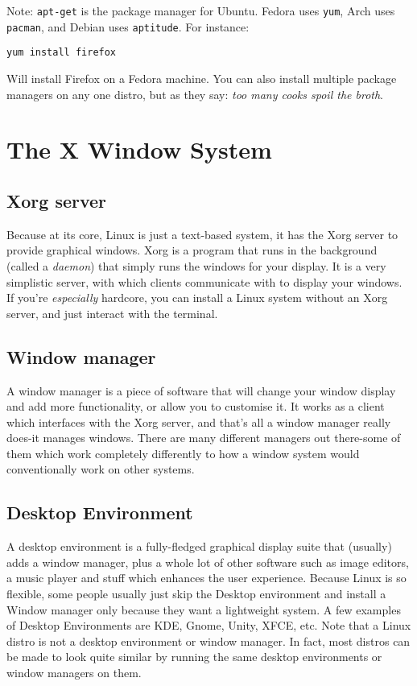 \documentclass{article}
\begin{document}
Note: \texttt{apt-get} is the package manager for Ubuntu. Fedora uses \texttt{yum}, Arch uses \texttt{pacman}, and Debian uses \texttt{aptitude}. For instance:
\begin{verbatim}
yum install firefox
\end{verbatim}
Will install Firefox on a Fedora machine.
You can also install multiple package managers on any one distro, but as they say: \emph{too many cooks spoil the broth}.

\section{The X Window System}

\subsection{Xorg server}
Because at its core, Linux is just a text-based system, it has the Xorg server to provide graphical windows. Xorg is a program that runs in the background (called a \emph{daemon}) that simply runs the windows for your display. It is a very simplistic server, with which clients communicate with to display your windows. If you're \emph{especially} hardcore, you can install a Linux system without an Xorg server, and just interact with the terminal. 

\subsection{Window manager}
A window manager is a piece of software that will change your window display and add more functionality, or allow you to customise it. It works as a client which interfaces with the Xorg server, and that's all a window manager really does-it manages windows. There are many different managers out there-some of them which work completely differently to how a window system would conventionally work on other systems.

\subsection{Desktop Environment}
A desktop environment is a fully-fledged graphical display suite that (usually) adds a window manager, plus a whole lot of other software such as image editors, a music player and stuff which enhances the user experience. Because Linux is so flexible, some people usually just skip the Desktop environment and install a Window manager only because they want a lightweight system. A few examples of Desktop Environments are KDE, Gnome, Unity, XFCE, etc. Note that a Linux distro is not a desktop environment or window manager. In fact, most distros can be made to look quite similar by running the same desktop environments or window managers on them.
\end{document}
